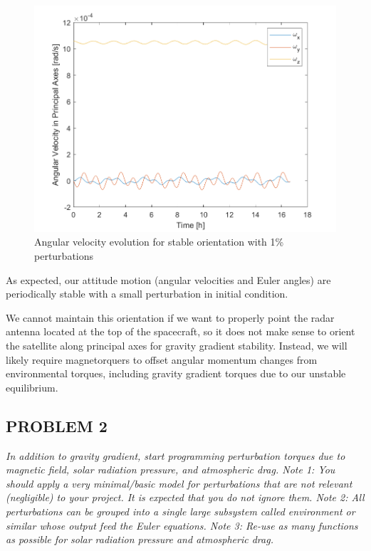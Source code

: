 \begin{figure}[H]
\centering
\includegraphics[scale=0.6]{Images/ps5_problem1c_angvel.png}
\caption{Angular velocity evolution for stable orientation with 1\% perturbations}
\label{fig:ps5_problem1c_angvel}
\end{figure}

As expected, our attitude motion (angular velocities and Euler angles) are periodically stable with a small perturbation in initial condition.

We cannot maintain this orientation if we want to properly point the radar antenna located at the top of the spacecraft, so it does not make sense to orient the satellite along principal axes for gravity gradient stability. Instead, we will likely require magnetorquers to offset angular momentum changes from environmental torques, including gravity gradient torques due to our unstable equilibrium.


\subsection{PROBLEM 2}
\textit{In addition to gravity gradient, start programming perturbation torques due to magnetic field, solar radiation pressure, and atmospheric drag. Note 1: You should apply a very minimal/basic model for perturbations that are not relevant (negligible) to your project. It is expected that you do not ignore them. Note 2: All perturbations can be grouped into a single large subsystem called environment or similar whose output feed
the Euler equations. Note 3: Re-use as many functions as possible for solar radiation pressure and atmospheric drag.}

